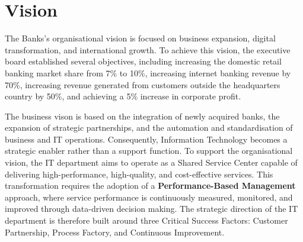 \chapter{Vision}
\label{cap:vision}


The Banks's organisational vision is focused on business expansion, digital transformation, and international growth. To achieve this vision, the executive board established several objectives, including increasing the domestic retail banking market share from 7\% to 10\%, increasing internet banking revenue by 70\%, increasing revenue generated from customers outside the headquarters country by 50\%, and achieving a 5\% increase in corporate profit. 

The business vison is based on the integration of newly acquired banks, the expansion of strategic partnerships, and the automation and standardisation of business and IT operations. Consequently, Information Technology becomes a strategic enabler rather than a support function. To support the organisational vision, the IT department aims to operate as a Shared Service Center capable of delivering high-performance, high-quality, and cost-effective services. This transformation requires the adoption of a \textbf{Performance-Based Management} approach, where service performance is continuously measured, monitored, and improved through data-driven decision making. The strategic direction of the IT department is therefore built around three Critical Success Factors: Customer Partnership, Process Factory, and Continuous Improvement.


